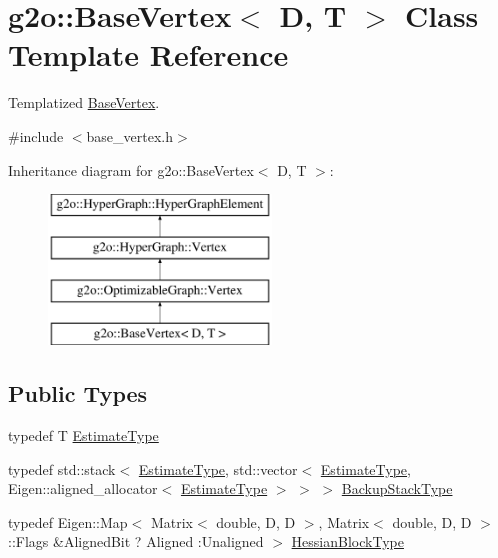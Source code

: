 \hypertarget{classg2o_1_1_base_vertex}{}\section{g2o\+:\+:Base\+Vertex$<$ D, T $>$ Class Template Reference}
\label{classg2o_1_1_base_vertex}


Templatized \mbox{\hyperlink{classg2o_1_1_base_vertex}{Base\+Vertex}}.  




{\ttfamily \#include $<$base\+\_\+vertex.\+h$>$}

Inheritance diagram for g2o\+:\+:Base\+Vertex$<$ D, T $>$\+:\begin{figure}[H]
\begin{center}
\leavevmode
\includegraphics[height=4.000000cm]{classg2o_1_1_base_vertex}
\end{center}
\end{figure}
\subsection*{Public Types}
\begin{DoxyCompactItemize}
\item 
typedef T \mbox{\hyperlink{classg2o_1_1_base_vertex_aaffb179a0d591da4769ec7c3fc7f7daa}{Estimate\+Type}}
\item 
typedef std\+::stack$<$ \mbox{\hyperlink{classg2o_1_1_base_vertex_aaffb179a0d591da4769ec7c3fc7f7daa}{Estimate\+Type}}, std\+::vector$<$ \mbox{\hyperlink{classg2o_1_1_base_vertex_aaffb179a0d591da4769ec7c3fc7f7daa}{Estimate\+Type}}, Eigen\+::aligned\+\_\+allocator$<$ \mbox{\hyperlink{classg2o_1_1_base_vertex_aaffb179a0d591da4769ec7c3fc7f7daa}{Estimate\+Type}} $>$ $>$ $>$ \mbox{\hyperlink{classg2o_1_1_base_vertex_ae6632291d46b458196bdb021a6c8cba1}{Backup\+Stack\+Type}}
\item 
typedef Eigen\+::\+Map$<$ Matrix$<$ double, D, D $>$, Matrix$<$ double, D, D $>$\+::Flags \&Aligned\+Bit ? Aligned \+:Unaligned $>$ \mbox{\hyperlink{classg2o_1_1_base_vertex_a887928bc60710e0ec9acb269ee7411db}{Hessian\+Block\+Type}}
\end{DoxyCompactItemize}

